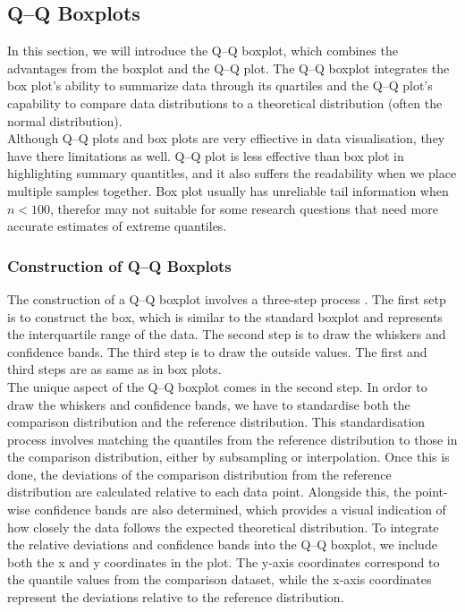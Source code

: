 \documentclass{article}\usepackage[]{graphicx}\usepackage[]{xcolor}
\numberwithin{equation}{section}
\begin{document}
\subsection{Q–Q Boxplots}
In this section, we will introduce the Q–Q boxplot, which combines the advantages from the boxplot and the Q–Q plot. The Q–Q boxplot integrates the box plot's ability to summarize data through its quartiles and the Q–Q plot's capability to compare data distributions to a theoretical distribution (often the normal distribution).\\

\noindent 
Although Q–Q plots and box plots are very effiective in data visualisation, they have there limitations as well. Q–Q plot is less effective than box plot in highlighting summary quantitles, and it also suffers the readability when we place multiple samples together. Box plot usually has unreliable tail information when $n<100$, therefor may not suitable for some research questions that need more accurate estimates of extreme quantiles.\\

\subsubsection{Construction of Q–Q Boxplots}
The construction of a Q–Q boxplot involves a three-step process \cite{rodu2022q}. The first setp is to construct the box, which is similar to the standard boxplot and represents the interquartile range of the data. The second step is to draw the whiskers and confidence bands. The third step is to draw the outside values. The first and third steps are as same as in box plots.\\

\noindent
The unique aspect of the Q–Q boxplot comes in the second step. In ordor to draw the whiskers and confidence bands, we have to standardise both the comparison distribution and the reference distribution. This standardisation process involves matching the quantiles from the reference distribution to those in the comparison distribution, either by subsampling or interpolation. Once this is done, the deviations of the comparison distribution from the reference distribution are calculated relative to each data point. Alongside this, the point-wise confidence bands are also determined, which provides a visual indication of how closely the data follows the expected theoretical distribution. To integrate the relative deviations and confidence bands into the Q–Q boxplot, we include both the x and y coordinates in the plot. The y-axis coordinates correspond to the quantile values from the comparison dataset, while the x-axis coordinates represent the deviations relative to the reference distribution.\\
\end{document}
